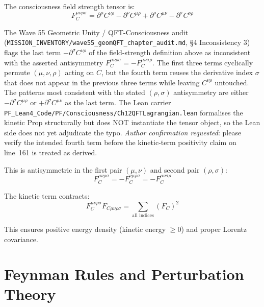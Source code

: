\begin{level3}
The consciousness field strength tensor is:
\begin{equation}
F^{\mu\nu\rho\sigma}_C = \partial^\mu C^{\nu\rho} - \partial^\nu C^{\mu\rho} + \partial^\rho C^{\mu\nu} - \partial^\sigma C^{\nu\rho}
\end{equation}

\begin{remark}
The Wave 55 Geometric Unity / QFT-Consciousness audit (\texttt{MISSION\_INVENTORY/wave55\_geomQFT\_chapter\_audit.md}, \S4 Inconsistency 3) flags the last term $-\partial^\sigma C^{\nu\rho}$ of the field-strength definition above as inconsistent with the asserted antisymmetry $F^{\mu\nu\rho\sigma}_C = -F^{\mu\nu\sigma\rho}_C$. The first three terms cyclically permute $(\mu,\nu,\rho)$ acting on $C$, but the fourth term reuses the derivative index $\sigma$ that does not appear in the previous three terms while leaving $C^{\nu\rho}$ untouched. The patterns most consistent with the stated $(\rho,\sigma)$ antisymmetry are either $-\partial^\sigma C^{\mu\rho}$ or $+\partial^\sigma C^{\mu\nu}$ as the last term. The Lean carrier \texttt{PF\_Lean4\_Code/PF/Consciousness/Ch12QFTLagrangian.lean} formalises the kinetic Prop structurally but does NOT instantiate the tensor object, so the Lean side does not yet adjudicate the typo. \emph{Author confirmation requested}: please verify the intended fourth term before the kinetic-term positivity claim on line~161 is treated as derived.
\end{remark}

This is antisymmetric in the first pair $(\mu, \nu)$ and second pair $(\rho, \sigma)$:
\begin{equation}
F^{\mu\nu\rho\sigma}_C = -F^{\nu\mu\rho\sigma}_C = -F^{\mu\nu\sigma\rho}_C
\end{equation}

The kinetic term contracts:
\begin{equation}
F^{\mu\nu\rho\sigma}_C F_{C\mu\nu\rho\sigma} = \sum_{\text{all indices}} (F_{C})^2
\end{equation}

This ensures positive energy density (kinetic energy $\geq 0$) and proper Lorentz covariance.
\end{level3}

\section{Feynman Rules and Perturbation Theory}

